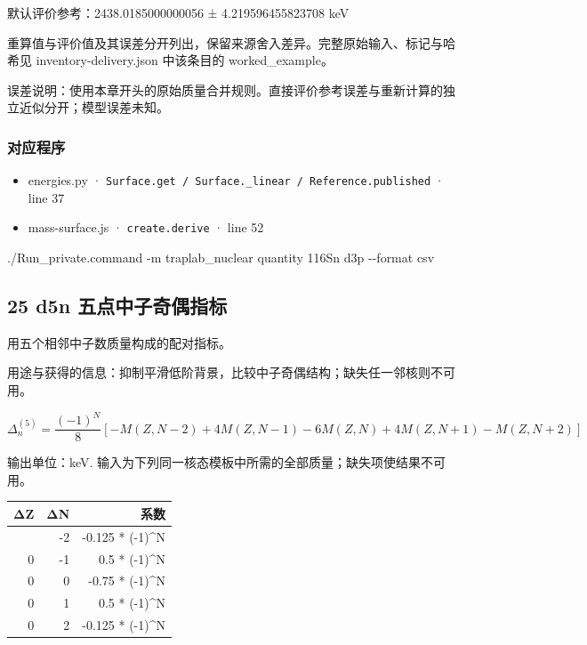 \documentclass[
  11pt,
  letterpaper,
]{article}
\newenvironment{Shaded}{}{}
\newcommand{\AttributeTok}[1]{\textcolor[rgb]{0.49,0.56,0.16}{#1}}
\newcommand{\ExtensionTok}[1]{#1}
\newcommand{\NormalTok}[1]{#1}
\providecommand{\tightlist}{%
  \setlength{\itemsep}{0pt}\setlength{\parskip}{0pt}}
\begin{document}
默认评价参考：2438.0185000000056 ± 4.219596455823708 keV

重算值与评价值及其误差分开列出，保留来源舍入差异。完整原始输入、标记与哈希见
inventory-delivery.json 中该条目的 worked\_example。

误差说明：使用本章开头的原始质量合并规则。直接评价参考误差与重新计算的独立近似分开；模型误差未知。

\subsubsection{对应程序}\label{ux5bf9ux5e94ux7a0bux5e8f-23}

\begin{itemize}
\tightlist
\item
  energies.py ·
  \texttt{Surface.get\ /\ Surface.\_linear\ /\ Reference.published} ·
  line 37
\item
  mass-surface.js · \texttt{create.derive} · line 52
\end{itemize}

\begin{Shaded}
\begin{Highlighting}[]
\ExtensionTok{./Run\_private.command} \AttributeTok{{-}m}\NormalTok{ traplab\_nuclear quantity 116Sn d3p }\AttributeTok{{-}{-}format}\NormalTok{ csv}
\end{Highlighting}
\end{Shaded}

\subsection{25 d5n
五点中子奇偶指标}\label{d5n-ux4e94ux70b9ux4e2dux5b50ux5947ux5076ux6307ux6807}

用五个相邻中子数质量构成的配对指标。

用途与获得的信息：抑制平滑低阶背景，比较中子奇偶结构；缺失任一邻核则不可用。

\[
\Delta_n^{(5)}=\frac{(-1)^N}{8}[-M(Z,N-2)+4M(Z,N-1)-6M(Z,N)+4M(Z,N+1)-M(Z,N+2)]
\]

输出单位：keV.
输入为下列同一核态模板中所需的全部质量；缺失项使结果不可用。

\begin{longtable}[]{@{}rrr@{}}
\toprule\noalign{}
ΔZ & ΔN & 系数 \\
\midrule\noalign{}
\endhead
\bottomrule\noalign{}
\endlastfoot
0 & -2 & -0.125 * (-1)\^{}N \\
0 & -1 & 0.5 * (-1)\^{}N \\
0 & 0 & -0.75 * (-1)\^{}N \\
0 & 1 & 0.5 * (-1)\^{}N \\
0 & 2 & -0.125 * (-1)\^{}N \\
\end{longtable}
\end{document}
